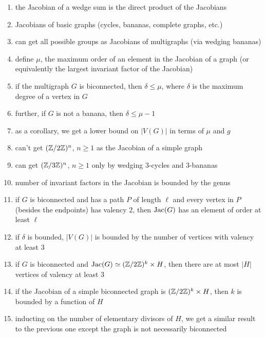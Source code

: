 \documentclass{amsart}
\begin{document}
\begin{enumerate}
\item the Jacobian of a wedge sum is the direct product of the
Jacobians

\item Jacobians of basic graphs (cycles, bananas, complete graphs,
etc.)

\item can get all possible groups as Jacobians of multigraphs (via
wedging bananas)

\item define $\mu$, the maximum order of an element in the Jacobian of
a graph (or equivalently the largest invariant factor of the Jacobian)

\item if the multigraph $G$ is biconnected, then $\delta\le\mu$, where
$\delta$ is the maximum degree of a vertex in $G$

\item further, if $G$ is not a banana, then $\delta\le\mu-1$

\item as a corollary, we get a lower bound on $|V(G)|$ in terms of
$\mu$ and $g$

\item can't get $(\mathbb{Z}/2\mathbb{Z})^n$, $n\ge1$ as the Jacobian of a simple
graph

\item can get $(\mathbb{Z}/3\mathbb{Z})^n$, $n\ge1$ only by wedging 3-cycles and
3-bananas

\item number of invariant factors in the Jacobian is bounded by the
genus

\item if $G$ is biconnected and has a path $P$ of length $\ell$ and
every vertex in $P$ (besides the endpoints) has valency 2, then
$\operatorname{Jac}(G)$ has an element of order at least $\ell$

\item if $\delta$ is bounded, $|V(G)|$ is bounded by the number of
vertices with valency at least 3

\item if $G$ is biconnected and $\operatorname{Jac}(G)\simeq(\mathbb{Z}/2\mathbb{Z})^k\times H$,
then there are at most $|H|$ vertices of valency at least 3

\item if the Jacobian of a simple biconnected graph is $(\mathbb{Z}/2\mathbb{Z})^k
\times H$, then $k$ is bounded by a function of $H$

\item inducting on the number of elementary divisors of $H$, we get a
similar result to the previous one except the graph is not necessarily
biconnected
\end{enumerate}
\end{document}
